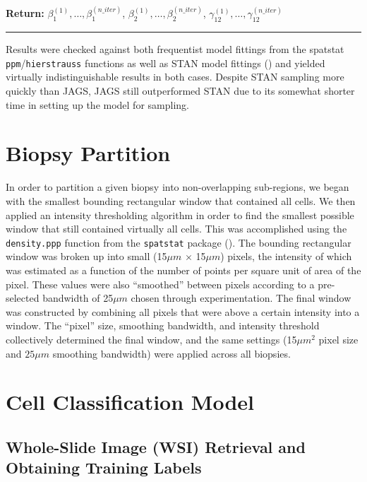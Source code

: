 \documentclass[
]{book}
\begin{document}
\textbf{Return:} \(\beta_1^{(1)}, \dots, \beta_1^{(n\_iter)}\), \(\beta_2^{(1)}, \dots, \beta_2^{(n\_iter)}\), \(\gamma_{12}^{(1)}, \dots, \gamma_{12}^{(n\_iter)}\)

\begin{center}\rule{0.5\linewidth}{0.5pt}\end{center}

Results were checked against both frequentist model fittings from the spatstat \texttt{ppm}/\texttt{hierstrauss} functions as well as STAN model fittings (\citet{Carpenter17}) and yielded virtually indistinguishable results in both cases. Despite STAN sampling more quickly than JAGS, JAGS still outperformed STAN due to its somewhat shorter time in setting up the model for sampling.

\hypertarget{biopsy-partition}{%
\chapter{Biopsy Partition}\label{biopsy-partition}}

In order to partition a given biopsy into non-overlapping sub-regions, we began with the smallest bounding rectangular window that contained all cells. We then applied an intensity thresholding algorithm in order to find the smallest possible window that still contained virtually all cells. This was accomplished using the \texttt{density.ppp} function from the \texttt{spatstat} package (\citet{BT05}). The bounding rectangular window was broken up into small (15\(\mu m\) \(\times\) 15\(\mu m\)) pixels, the intensity of which was estimated as a function of the number of points per square unit of area of the pixel. These values were also ``smoothed'' between pixels according to a pre-selected bandwidth of 25\(\mu m\) chosen through experimentation. The final window was constructed by combining all pixels that were above a certain intensity into a window. The ``pixel'' size, smoothing bandwidth, and intensity threshold collectively determined the final window, and the same settings (15\(\mu m^2\) pixel size and \(25\mu m\) smoothing bandwidth) were applied across all biopsies.

\hypertarget{cell-classification-model}{%
\chapter{Cell Classification Model}\label{cell-classification-model}}

\hypertarget{whole-slide-image-wsi-retrieval-and-obtaining-training-labels}{%
\section{Whole-Slide Image (WSI) Retrieval and Obtaining Training Labels}\label{whole-slide-image-wsi-retrieval-and-obtaining-training-labels}}
\end{document}
